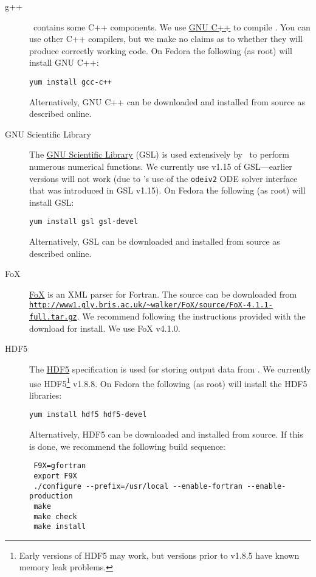 \begin{description}
\item [g++] \glc\ contains some C++ components. We use \href{http://gcc.gnu.org/projects/cxx0x.html}{GNU C++} to compile \glc. You can use other C++ compilers, but we make no claims as to whether they will produce correctly working code. On Fedora the following (as root) will install GNU C++:
\begin{verbatim}
yum install gcc-c++
\end{verbatim}
Alternatively, GNU C++ can be downloaded and installed from source as described online.

\item [GNU Scientific Library] The \href{http://www.gnu.org/software/gsl/}{GNU Scientific Library} (GSL) is used extensively by \glc\ to perform numerous numerical functions. We currently use v1.15 of GSL---earlier versions will not work (due to \glc's use of the {\tt odeiv2} ODE solver interface that was introduced in GSL v1.15). On Fedora the following (as root) will install GSL:
\begin{verbatim}
yum install gsl gsl-devel
\end{verbatim}
Alternatively, GSL can be downloaded and installed from source as described online.

\item [FoX] \href{http://uszla.me.uk/space/software/FoX/}{FoX} is an XML parser for Fortran. The source can be downloaded from \newline\href{http://www1.gly.bris.ac.uk/~walker/FoX/source/FoX-4.1.1-full.tar.gz}{\tt http://www1.gly.bris.ac.uk/\textasciitilde{}walker/FoX/source/FoX-4.1.1-full.tar.gz}. We recommend following the instructions provided with the download for install. We use FoX v4.1.0.

\item [HDF5] The \href{http://www.hdfgroup.org/HDF5/}{HDF5} specification is used for storing output data from \glc. We currently use HDF5\footnote{Early versions of HDF5 may work, but versions prior to v1.8.5 have known memory leak problems.} v1.8.8. On Fedora the following (as root) will install the HDF5 libraries:
\begin{verbatim}
yum install hdf5 hdf5-devel
\end{verbatim}
Alternatively, HDF5 can be downloaded and installed from source. If this is done, we recommend the following build sequence:
\begin{verbatim}
 F9X=gfortran
 export F9X
 ./configure --prefix=/usr/local --enable-fortran --enable-production
 make
 make check
 make install
\end{verbatim}


\end{description}
